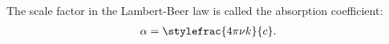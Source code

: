     \begin{definition}\label{optics:absorption_coefficient}
        The scale factor in the Lambert-Beer law is called the absorption coefficient:
        \begin{gather}
            \alpha = \stylefrac{4\pi\nu k}{c}.
        \end{gather}
    \end{definition}